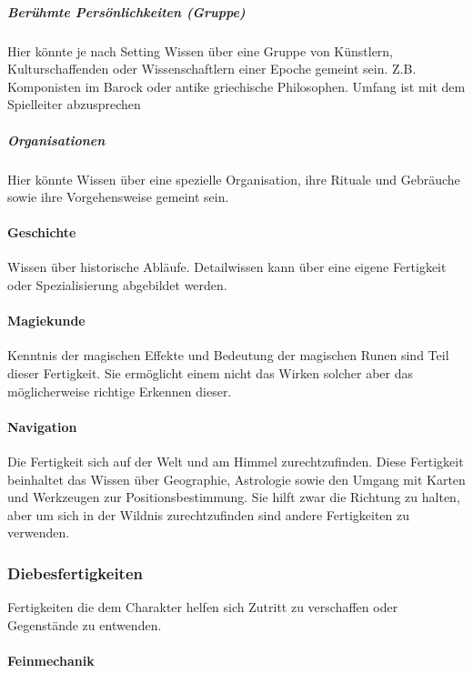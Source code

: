 \documentclass{article}
\begin{document}
\subparagraph{Berühmte Persönlichkeiten (Gruppe)}

Hier könnte je nach Setting Wissen über eine Gruppe von Künstlern, Kulturschaffenden oder Wissenschaftlern einer
Epoche gemeint sein. Z.B. Komponisten im Barock oder antike griechische Philosophen. Umfang ist mit dem Spielleiter
abzusprechen

\subparagraph{Organisationen}

Hier könnte Wissen über eine spezielle Organisation, ihre Rituale und Gebräuche sowie ihre Vorgehensweise gemeint sein.

\paragraph{Geschichte}

Wissen über historische Abläufe. Detailwissen kann über eine eigene Fertigkeit oder Spezialisierung abgebildet
werden.

\paragraph{Magiekunde}

Kenntnis der magischen Effekte und Bedeutung der magischen Runen sind Teil dieser Fertigkeit. Sie ermöglicht einem
nicht das Wirken solcher aber das möglicherweise richtige Erkennen dieser.

\paragraph{Navigation}

Die Fertigkeit sich auf der Welt und am Himmel zurechtzufinden. Diese Fertigkeit beinhaltet das Wissen über
Geographie, Astrologie sowie den Umgang mit Karten und Werkzeugen zur Positionsbestimmung. Sie hilft zwar die Richtung
zu halten, aber um sich in der Wildnis zurechtzufinden sind andere Fertigkeiten zu verwenden.

\subsubsection{Diebesfertigkeiten}

Fertigkeiten die dem Charakter helfen sich Zutritt zu verschaffen oder Gegenstände zu entwenden.

\paragraph{Feinmechanik}
\end{document}
